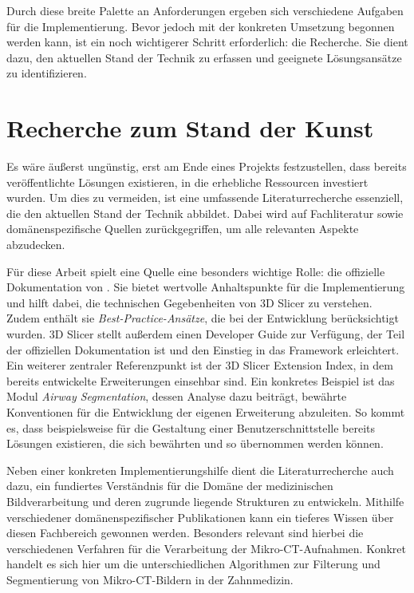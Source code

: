 Durch diese breite Palette an Anforderungen ergeben sich verschiedene Aufgaben
für die Implementierung. Bevor jedoch mit der konkreten Umsetzung begonnen werden
kann, ist ein noch wichtigerer Schritt erforderlich: die Recherche. Sie dient
dazu, den aktuellen Stand der Technik zu erfassen und geeignete Lösungsansätze zu
identifizieren.

\section{Recherche zum Stand der Kunst}
Es wäre äußerst ungünstig, erst am Ende eines Projekts festzustellen, dass bereits
veröffentlichte Lösungen existieren, in die erhebliche Ressourcen investiert
wurden. Um dies zu vermeiden, ist eine umfassende Literaturrecherche essenziell,
die den aktuellen Stand der Technik abbildet. Dabei wird auf Fachliteratur sowie
domänenspezifische Quellen zurückgegriffen, um alle relevanten Aspekte abzudecken.

Für diese Arbeit spielt eine Quelle eine besonders wichtige Rolle: die
offizielle Dokumentation von \citet{slicer2024}. Sie bietet wertvolle
Anhaltspunkte für die Implementierung und hilft dabei, die technischen Gegebenheiten
von 3D Slicer zu verstehen. Zudem enthält sie \textit{Best-Practice-Ansätze},
die bei der Entwicklung berücksichtigt wurden. 3D Slicer stellt außerdem einen Developer
Guide zur Verfügung, der Teil der offiziellen Dokumentation ist und den Einstieg
in das Framework erleichtert. Ein weiterer zentraler Referenzpunkt ist der 3D Slicer
Extension Index, in dem bereits entwickelte Erweiterungen einsehbar sind. Ein konkretes
Beispiel ist das Modul \textit{Airway Segmentation}, dessen Analyse dazu beiträgt,
bewährte Konventionen für die Entwicklung der eigenen Erweiterung abzuleiten. So
kommt es, dass beispielsweise für die Gestaltung einer Benutzerschnittstelle
bereits Lösungen existieren, die sich bewährten und so übernommen werden können.

Neben einer konkreten Implementierungshilfe dient die Literaturrecherche auch dazu,
ein fundiertes Verständnis für die Domäne der medizinischen Bildverarbeitung und
deren zugrunde liegende Strukturen zu entwickeln. Mithilfe verschiedener domänenspezifischer
Publikationen kann ein tieferes Wissen über diesen Fachbereich gewonnen werden.
Besonders relevant sind hierbei die verschiedenen Verfahren für die Verarbeitung
der Mikro-\ac{CT}-Aufnahmen. Konkret handelt es sich hier um die
unterschiedlichen Algorithmen zur Filterung und Segmentierung von Mikro-\ac{CT}-Bildern
in der Zahnmedizin.

